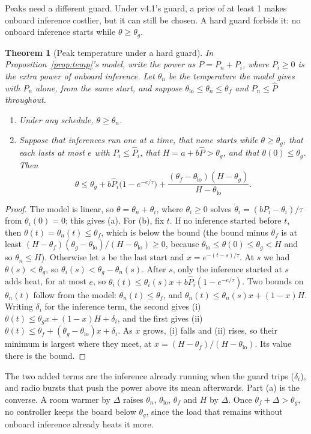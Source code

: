 \documentclass[conference]{IEEEtran}
\newtheorem{theorem}{Theorem}
\begin{document}
Peaks need a different guard. Under v4.1's guard, a price of at least 1 makes onboard inference costlier, but it can
still be chosen. A hard guard forbids it: no onboard inference starts while $\theta \ge \theta_g$.
\begin{theorem}[Peak temperature under a hard guard]\label{thm:guard}
In Proposition~\ref{prop:temp}'s model, write the power as $P = P_n + P_i$, where $P_i \ge 0$ is the extra power of
onboard inference. Let $\theta_n$ be the temperature the model gives with $P_n$ alone, from the same start, and
suppose $\theta_{\mathrm{lo}} \le \theta_n \le \theta_f$ and $P_n \le \hat P$ throughout.
\begin{enumerate}
\item[(a)] Under any schedule, $\theta \ge \theta_n$.
\item[(b)] Suppose that inferences run one at a time, that none starts while $\theta \ge \theta_g$, that each lasts at most $e$ with
$P_i \le \hat P_i$, that $H = a + b\hat P > \theta_g$, and that $\theta(0) \le \theta_g$. Then
\begin{equation*}
\theta \le \theta_g + b\hat P_i\big(1 - e^{-e/\tau}\big) + \frac{(\theta_f - \theta_{\mathrm{lo}})(H - \theta_g)}{H - \theta_{\mathrm{lo}}}.
\end{equation*}
\end{enumerate}
\end{theorem}
\begin{proof}
The model is linear, so $\theta = \theta_n + \theta_i$, where $\theta_i \ge 0$ solves
$\dot\theta_i = (bP_i - \theta_i)/\tau$ from $\theta_i(0) = 0$; this gives (a). For (b), fix $t$. If no inference
started before $t$, then $\theta(t) = \theta_n(t) \le \theta_f$, which is below the bound (the bound minus $\theta_f$
is at least $(H - \theta_f)(\theta_g - \theta_{\mathrm{lo}})/(H - \theta_{\mathrm{lo}}) \ge 0$, because
$\theta_{\mathrm{lo}} \le \theta(0) \le \theta_g < H$ and so $\theta_n \le H$). Otherwise let $s$ be the last
start and $x = e^{-(t-s)/\tau}$. At $s$ we had $\theta(s) < \theta_g$, so $\theta_i(s) < \theta_g - \theta_n(s)$.
After $s$, only the inference started at $s$ adds heat, for at most $e$, so
$\theta_i(t) \le \theta_i(s)x + b\hat P_i(1 - e^{-e/\tau})$. Two bounds on $\theta_n(t)$ follow from the model:
$\theta_n(t) \le \theta_f$, and $\theta_n(t) \le \theta_n(s)x + (1-x)H$. Writing $\delta_i$ for the inference term,
the second gives (i) $\theta(t) \le \theta_g x + (1-x)H + \delta_i$, and the first gives
(ii) $\theta(t) \le \theta_f + (\theta_g - \theta_{\mathrm{lo}})x + \delta_i$. As $x$ grows, (i) falls and (ii)
rises, so their minimum is largest where they meet, at $x = (H - \theta_f)/(H - \theta_{\mathrm{lo}})$. Its value
there is the bound.
\end{proof}
The two added terms are the inference already running when the guard trips ($\delta_i$), and radio bursts that push
the power above its mean afterwards. Part (a) is the converse. A room warmer by $\Delta$ raises $\theta_n$,
$\theta_{\mathrm{lo}}$, $\theta_f$ and $H$ by $\Delta$. Once $\theta_f + \Delta > \theta_g$, no controller keeps the
board below $\theta_g$, since the load that remains without onboard inference already heats it more.
\end{document}
